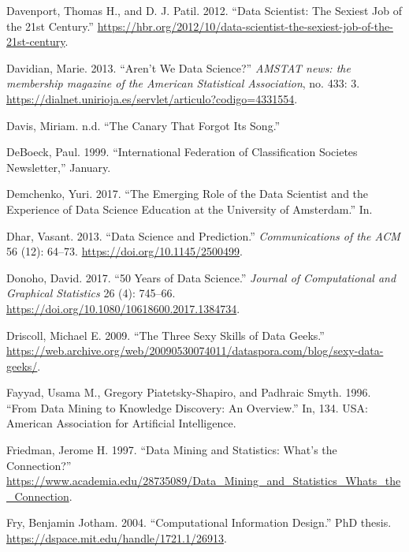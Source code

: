 \documentclass[
  letterpaper,
]{report}
\newlength{\cslhangindent}
\newlength{\cslentryspacingunit} %
\newenvironment{CSLReferences}[2] %
 {%
  \setlength{\parindent}{0pt}
  \ifodd #1
  \let\oldpar\par
  \def\par{\hangindent=\cslhangindent\oldpar}
  \fi
  \setlength{\parskip}{#2\cslentryspacingunit}
 }%
 {}
\begin{document}
\begin{CSLReferences}{1}{0}
\leavevmode{}%
Davenport, Thomas H., and D. J. Patil. 2012. {``Data Scientist: The
Sexiest Job of the 21st Century.''}
\url{https://hbr.org/2012/10/data-scientist-the-sexiest-job-of-the-21st-century}.

\leavevmode{}%
Davidian, Marie. 2013. {``Aren't We Data Science?''} \emph{AMSTAT news:
the membership magazine of the American Statistical Association}, no.
433: 3.
\url{https://dialnet.unirioja.es/servlet/articulo?codigo=4331554}.

\leavevmode{}%
Davis, Miriam. n.d. {``The Canary That Forgot Its Song.''}

\leavevmode{}%
DeBoeck, Paul. 1999. {``International Federation of Classification
Societes Newsletter,''} January.

\leavevmode{}%
Demchenko, Yuri. 2017. {``The Emerging Role of the Data Scientist and
the Experience of Data Science Education at the University of
Amsterdam.''} In.

\leavevmode{}%
Dhar, Vasant. 2013. {``Data Science and Prediction.''}
\emph{Communications of the ACM} 56 (12): 64--73.
\url{https://doi.org/10.1145/2500499}.

\leavevmode{}%
Donoho, David. 2017. {``50 Years of Data Science.''} \emph{Journal of
Computational and Graphical Statistics} 26 (4): 745--66.
\url{https://doi.org/10.1080/10618600.2017.1384734}.

\leavevmode{}%
Driscoll, Michael E. 2009. {``The Three Sexy Skills of Data Geeks.''}
\url{https://web.archive.org/web/20090530074011/dataspora.com/blog/sexy-data-geeks/}.

\leavevmode{}%
Fayyad, Usama M., Gregory Piatetsky-Shapiro, and Padhraic Smyth. 1996.
{``From Data Mining to Knowledge Discovery: An Overview.''} In, 134.
USA: American Association for Artificial Intelligence.

\leavevmode{}%
Friedman, Jerome H. 1997. {``Data Mining and Statistics: What's the
Connection?''}
\url{https://www.academia.edu/28735089/Data_Mining_and_Statistics_Whats_the_Connection}.

\leavevmode{}%
Fry, Benjamin Jotham. 2004. {``Computational Information Design.''} PhD
thesis. \url{https://dspace.mit.edu/handle/1721.1/26913}.


\end{CSLReferences}
\end{document}
